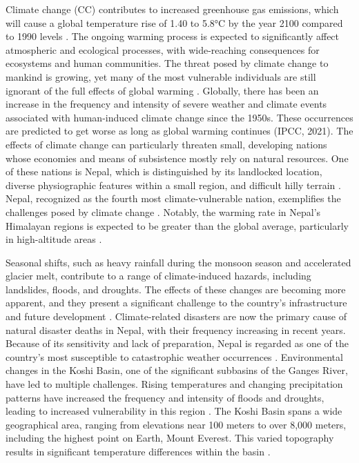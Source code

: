Climate change (CC) contributes to increased greenhouse gas emissions, which will cause a global temperature rise of 1.40 to 5.8°C by the year 2100 compared to 1990 levels \parencite{mccarthy_climate_2001}. The ongoing warming process is expected to significantly affect atmospheric and ecological processes, with wide-reaching consequences for ecosystems and human communities. The threat posed by climate change to mankind is growing, yet many of the most vulnerable individuals are still ignorant of the full effects of global warming \parencite{maharjan_tharu_nodate}. Globally, there has been an increase in the frequency and intensity of severe weather and climate events associated with human-induced climate change since the 1950s. These occurrences are predicted to get worse as long as global warming continues \parencite{intergovernmental_panel_on_climate_change_ipcc_climate_2023} (IPCC, 2021).
The effects of climate change can particularly threaten small, developing nations whose economies and means of subsistence mostly rely on natural resources. One of these nations is Nepal, which is distinguished by its landlocked location, diverse physiographic features within a small region, and difficult hilly terrain \parencite{shrestha_climate_2011}. Nepal, recognized as the fourth most climate-vulnerable nation, exemplifies the challenges posed by climate change \parencite{manandhar_adapting_2011,reilly_climate_in_usa}. Notably, the warming rate in Nepal's Himalayan regions is expected to be greater than the global average, particularly in high-altitude areas \parencite{casestudy_bhattarai,yao_recent_2019,shrestha_maximum_1999}.


Seasonal shifts, such as heavy rainfall during the monsoon season and accelerated glacier melt, contribute to a range of climate-induced hazards, including landslides, floods, and droughts. The effects of these changes are becoming more apparent, and they present a significant challenge to the country’s infrastructure and future development \parencite{pokhrel_climate_2013}. Climate-related disasters are now the primary cause of natural disaster deaths in Nepal, with their frequency increasing in recent years. Because of its sensitivity and lack of preparation, Nepal is regarded as one of the country’s most susceptible to catastrophic weather occurrences \parencite{aksha_spatial_2018}. Environmental changes in the Koshi Basin, one of the significant subbasins of the Ganges River, have led to multiple challenges. Rising temperatures and changing precipitation patterns have increased the frequency and intensity of floods and droughts, leading to increased vulnerability in this region \parencite{bastakoti_agriculture_2017}. The Koshi Basin spans a wide geographical area, ranging from elevations near 100 meters to over 8,000 meters, including the highest point on Earth, Mount Everest. This varied topography results in significant temperature differences within the basin \parencite{bhatt_climate_2014}.

